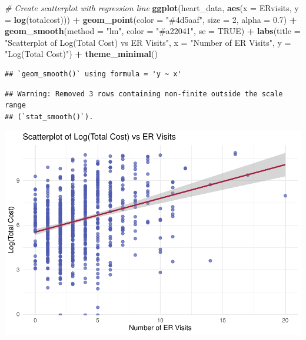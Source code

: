 \documentclass[
]{article}
\newenvironment{Shaded}{\begin{snugshade}}{\end{snugshade}}
\newcommand{\AttributeTok}[1]{\textcolor[rgb]{0.13,0.29,0.53}{#1}}
\newcommand{\CommentTok}[1]{\textcolor[rgb]{0.56,0.35,0.01}{\textit{#1}}}
\newcommand{\ConstantTok}[1]{\textcolor[rgb]{0.56,0.35,0.01}{#1}}
\newcommand{\DecValTok}[1]{\textcolor[rgb]{0.00,0.00,0.81}{#1}}
\newcommand{\FloatTok}[1]{\textcolor[rgb]{0.00,0.00,0.81}{#1}}
\newcommand{\FunctionTok}[1]{\textcolor[rgb]{0.13,0.29,0.53}{\textbf{#1}}}
\newcommand{\NormalTok}[1]{#1}
\newcommand{\SpecialCharTok}[1]{\textcolor[rgb]{0.81,0.36,0.00}{\textbf{#1}}}
\newcommand{\StringTok}[1]{\textcolor[rgb]{0.31,0.60,0.02}{#1}}
\begin{document}
\begin{Shaded}
\begin{Highlighting}[]
\CommentTok{\# Create scatterplot with regression line}
\FunctionTok{ggplot}\NormalTok{(heart\_data, }\FunctionTok{aes}\NormalTok{(}\AttributeTok{x =}\NormalTok{ ERvisits, }\AttributeTok{y =} \FunctionTok{log}\NormalTok{(totalcost))) }\SpecialCharTok{+}
  \FunctionTok{geom\_point}\NormalTok{(}\AttributeTok{color =} \StringTok{"\#4d5aaf"}\NormalTok{, }\AttributeTok{size =} \DecValTok{2}\NormalTok{, }\AttributeTok{alpha =} \FloatTok{0.7}\NormalTok{) }\SpecialCharTok{+}
  \FunctionTok{geom\_smooth}\NormalTok{(}\AttributeTok{method =} \StringTok{"lm"}\NormalTok{, }\AttributeTok{color =} \StringTok{"\#a22041"}\NormalTok{, }\AttributeTok{se =} \ConstantTok{TRUE}\NormalTok{) }\SpecialCharTok{+}
  \FunctionTok{labs}\NormalTok{(}\AttributeTok{title =} \StringTok{"Scatterplot of Log(Total Cost) vs ER Visits"}\NormalTok{,}
       \AttributeTok{x =} \StringTok{"Number of ER Visits"}\NormalTok{,}
       \AttributeTok{y =} \StringTok{"Log(Total Cost)"}\NormalTok{) }\SpecialCharTok{+}
  \FunctionTok{theme\_minimal}\NormalTok{()}
\end{Highlighting}
\end{Shaded}

\begin{verbatim}
## `geom_smooth()` using formula = 'y ~ x'
\end{verbatim}

\begin{verbatim}
## Warning: Removed 3 rows containing non-finite outside the scale range
## (`stat_smooth()`).
\end{verbatim}

\includegraphics{p8130_hw4_xx2485_files/figure-latex/unnamed-chunk-13-1.pdf}
\end{document}
